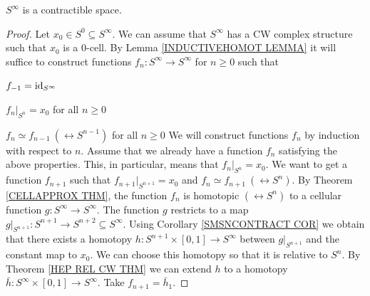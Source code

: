\begin{proposition}
\label{SINFTY CONTRACTIBLE PROP}
$S^{\infty}$ is a contractible space. 
\end{proposition}

\begin{proof}
Let $x_{0}\in S^{0}\subseteq S^{\infty}$. We can assume that $S^{\infty}$ has a 
CW complex structure such that $x_{0}$ is a $0$-cell. 
By Lemma \ref{INDUCTIVEHOMOT LEMMA} it will suffice to construct functions 
$f_{n}\colon S^{\infty} \to S^{\infty}$ for $n\geq 0$ such that 
\benu
\item $f_{-1} = \mathrm{id}_{S^{\infty}}$
\item $f_{n}|_{S^{n}} = x_{0}$ for all $n\geq 0$
\item $f_{n}\simeq f_{n-1} \ (\rel S^{n-1})$ for all $n\geq 0$
\eenu
We will construct functions $f_{n}$ by induction with respect to $n$. Assume that we 
already have a function $f_{n}$ satisfying the above properties. This, in particular, 
means that $f_{n}|_{S^{n}} = x_{0}$. We want to get a function $f_{n+1}$ such that 
$f_{n+1}|_{S^{n+1}} = x_{0}$ and $f_{n}\simeq f_{n+1} \ (\rel S^{n})$.
By Theorem \ref{CELLAPPROX THM}, the function $f_{n}$ is homotopic $(\rel S^{n})$ 
to a cellular function $g\colon S^{\infty} \to S^{\infty}$. The function 
$g$ restricts to a map $g|_{S^{n+1}}\colon S^{n+1} \to S^{n+2} \subseteq S^{\infty}$. 
Using Corollary \ref{SMSNCONTRACT COR} we obtain that there exists a homotopy 
$h\colon S^{n+1}\times [0, 1] \to S^{\infty}$ between $g|_{S^{n+1}}$ and the constant map 
to $x_{0}$. We can choose this homotopy so that it is relative to $S^{n}$. 
By Theorem \ref{HEP REL CW THM} we can extend $h$ to a homotopy 
$\bar h \colon S^{\infty}\times [0, 1] \to S^{\infty}$. Take $f_{n+1} = {\bar h}_{1}$.  


\end{proof}

